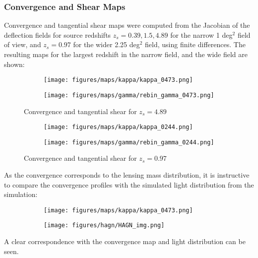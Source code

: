 \documentclass{beamer}
\begin{document}
  \begin{frame}
    \frametitle{\sc Convergence and Shear Maps}
    Convergence and tangential shear maps were computed from the Jacobian of the deflection fields for source redshifts $z_s = 0.39, 1.5, 4.89$ for the narrow 1 deg$^2$ field of view, and $z_s = 0.97$ for the wider 2.25 deg$^2$ field, using finite differences. The resulting maps for the largest redshift in the narrow field, and the wide field are shown:
  \end{frame}

  \begin{frame}
    \begin{figure}[H]
      \centering
      \begin{subfigure}{0.49\textwidth}
        \texttt{[image: figures/maps/kappa/kappa\_0473.png]}
      \end{subfigure}
      \hfill
      \begin{subfigure}{0.49\textwidth}
        \texttt{[image: figures/maps/gamma/rebin\_gamma\_0473.png]}
      \end{subfigure}
      \hfill
      \caption{Convergence and tangential shear for $z_s = 4.89$}
      \label{fig:0473 kappa gamma}
    \end{figure}
  \end{frame}

  \begin{frame}
    \begin{figure}[H]
      \centering
      \begin{subfigure}{0.49\textwidth}
        \texttt{[image: figures/maps/kappa/kappa\_0244.png]}
      \end{subfigure}
      \hfill
      \begin{subfigure}{0.49\textwidth}
        \texttt{[image: figures/maps/gamma/rebin\_gamma\_0244.png]}
      \end{subfigure}
      \hfill
      \caption{Convergence and tangential shear for $z_s = 0.97$}
      \label{fig:0244 kappa gamma}
    \end{figure}
  \end{frame}

  \begin{frame}
    As the convergence corresponds to the lensing mass distribution, it is instructive to compare the convergence profiles with the simulated light distribution from the simulation:

    \begin{figure}[H]
      \begin{subfigure}{0.49\textwidth}
        \texttt{[image: figures/maps/kappa/kappa\_0473.png]}
      \end{subfigure}
      \hfill
      \begin{subfigure}{0.35\textwidth}
        \texttt{[image: figures/hagn/HAGN\_img.png]}
      \end{subfigure}
      \hfill
    \end{figure}

    A clear correspondence with the convergence map and light distribution can be seen.
  \end{frame}
\end{document}
